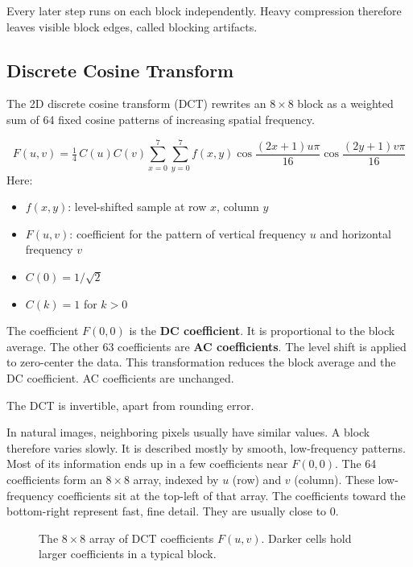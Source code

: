 \documentclass[11pt,a4paper]{article}
\begin{document}
Every later step runs on each block independently. Heavy compression therefore leaves visible block edges, called blocking artifacts.

\subsection{Discrete Cosine Transform}

The 2D discrete cosine transform (DCT) \cite{ahmed1974} rewrites an $8\times8$ block as a weighted sum of 64 fixed cosine patterns of increasing spatial frequency.

\[
F(u,v)=\tfrac14\,C(u)C(v)\sum_{x=0}^{7}\sum_{y=0}^{7}
f(x,y)\cos\frac{(2x+1)u\pi}{16}\cos\frac{(2y+1)v\pi}{16}
\]
Here:
\begin{itemize}
\item $f(x,y)$: level-shifted sample at row $x$, column $y$
\item $F(u,v)$: coefficient for the pattern of vertical frequency $u$ and horizontal frequency $v$
\item $C(0)=1/\sqrt2$
\item $C(k)=1$ for $k>0$
\end{itemize}

The coefficient $F(0,0)$ is the \textbf{DC coefficient}. It is proportional to the block average. The other 63 coefficients are \textbf{AC coefficients}. The level shift is applied to zero-center the data. This transformation reduces the block average and the DC coefficient. AC coefficients are unchanged. 

The DCT is invertible, apart from rounding error.

In natural images, neighboring pixels usually have similar values. A block therefore varies slowly. It is described mostly by smooth, low-frequency patterns. Most of its information ends up in a few coefficients near $F(0,0)$. The 64 coefficients form an $8\times8$ array, indexed by $u$ (row) and $v$ (column). These low-frequency coefficients sit at the top-left of that array. The coefficients toward the bottom-right represent fast, fine detail. They are usually close to 0.

\begin{figure}[h]
\centering
{}
\caption{The $8\times8$ array of DCT coefficients $F(u,v)$. Darker cells hold larger coefficients in a typical block.}
\label{fig:dct-array}
\end{figure}
\end{document}
